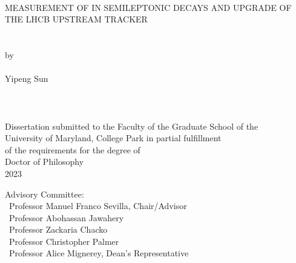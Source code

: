 \thispagestyle{empty}
\hbox{\ }
\vspace{1.5in}
\singlespacing

\begin{center}
{\large MEASUREMENT OF \RDX IN SEMILEPTONIC \B DECAYS AND
UPGRADE OF THE LHCB UPSTREAM TRACKER}  \\
\ \\
\ \\
\large{by} \\
\ \\
\large{Yipeng Sun}
\ \\
\ \\
\ \\
\ \\
\normalsize
Dissertation submitted to the Faculty of the Graduate School of the \\
University of Maryland, College Park in partial fulfillment \\
of the requirements for the degree of \\
Doctor of Philosophy \\
2023
\end{center}

\vspace{7.5em}

\noindent Advisory Committee: \\
\hbox{\ }\hspace{.5in}Professor Manuel Franco Sevilla, Chair/Advisor \\
\hbox{\ }\hspace{.5in}Professor Abohassan Jawahery \\
\hbox{\ }\hspace{.5in}Professor Zackaria Chacko \\
\hbox{\ }\hspace{.5in}Professor Christopher Palmer \\
\hbox{\ }\hspace{.5in}Professor Alice Mignerey, Dean's Representative

